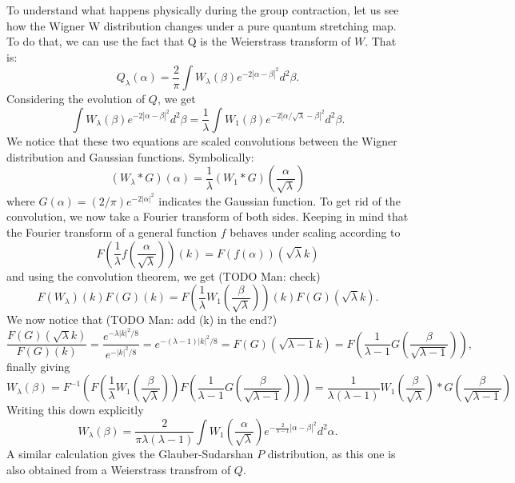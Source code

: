 \documentclass{article}
\begin{document}
To understand what happens physically during the group contraction, let us see how the Wigner W distribution changes under a pure quantum stretching map. To do that, we can use the fact that Q is the Weierstrass transform of $W$. That is:
\begin{equation}
    Q_\lambda(\alpha)=\frac{2}{\pi}\int W_\lambda(\beta)e^{-2|\alpha-\beta|^2}d^2\beta.
\end{equation}
Considering the evolution of $Q$, we get
\begin{equation}
    \int W_\lambda(\beta)e^{-2|\alpha-\beta|^2}d^2\beta=\frac{1}{\lambda}\int W_1(\beta)e^{-2|\alpha/\sqrt{\lambda}-\beta|^2}d^2\beta.
\end{equation}
We notice that these two equations are scaled convolutions between the Wigner distribution and Gaussian functions. Symbolically:
\begin{equation}
    (W_\lambda \ast G)(\alpha)=\frac{1}{\lambda}(W_1\ast G)\left(\frac{\alpha}{\sqrt{\lambda}}\right)
\end{equation}
where $G(\alpha)=(2/\pi) e^{-2|\alpha|^2}$ indicates the Gaussian function. To get rid of the convolution, we now take a Fourier transform of both sides. Keeping in mind that the Fourier transform of a general function $f$ behaves under scaling according to
\begin{equation}
    F\left(\frac{1}{\lambda}f\left(\frac{\alpha}{\sqrt{\lambda}}\right)\right)(k)=F(f(\alpha))(\sqrt{\lambda}k)
\end{equation} and using the convolution theorem, we get (TODO Man: check)
\begin{equation}
  F(W_\lambda)(k)F(G)(k)=F\left(\frac{1}{\lambda}W_1\left(\frac{\beta}{\sqrt{\lambda}}\right)\right)(k)F(G)(\sqrt{\lambda}k).  
\end{equation}
We now notice that (TODO Man: add (k) in the end?)
\begin{equation}
    \frac{F(G)(\sqrt{\lambda}k)}{F(G)(k)}=\frac{e^{-\lambda|k|^2/8}}{e^{-|k|^2/8}}=e^{-(\lambda-1)|k|^2/8}=F(G)(\sqrt{\lambda-1}k)=F\left(\frac{1}{\lambda-1}G\left(\frac{\beta}{\sqrt{\lambda-1}}\right)\right),
\end{equation}
finally giving
\begin{equation}
    W_\lambda(\beta)=F^{-1}\left(F\left(\frac{1}{\lambda}W_1\left(\frac{\beta}{\sqrt{\lambda}}\right)\right)F\left(\frac{1}{\lambda-1}G\left(\frac{\beta}{\sqrt{\lambda-1}}\right)\right)\right)=\frac{1}{\lambda(\lambda-1)}W_1\left(\frac{\beta}{\sqrt{\lambda}}\right) \ast G\left(\frac{\beta}{\sqrt{\lambda-1}}\right)
    \label{Fourier}
\end{equation}
Writing this down explicitly
\begin{equation}
   W_\lambda(\beta)=\frac{2}{\pi\lambda(\lambda-1)}\int W_1\left(\frac{\alpha}{\sqrt{\lambda}}\right)e^{-\frac{2}{\lambda-1}\left|\alpha-\beta\right|^2}d^2\alpha.
\end{equation}
A similar calculation gives the Glauber-Sudarshan $P$ distribution, as this one is also obtained from a Weierstrass transfrom of $Q$.
\end{document}
